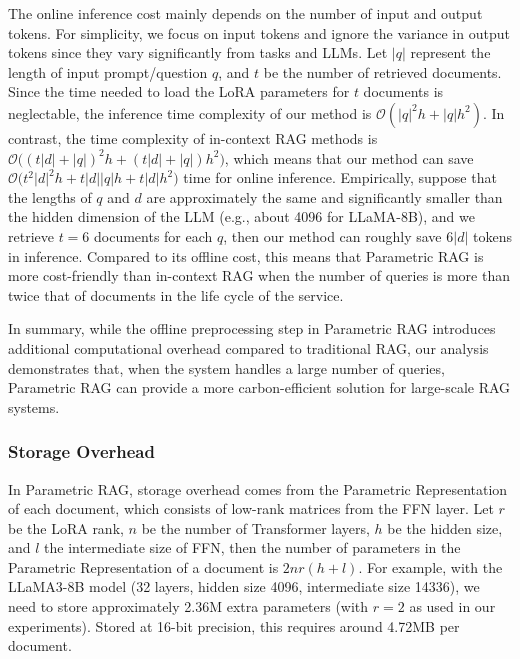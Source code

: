 \documentclass[sigconf,natbib=true,anonymous=false]{acmart}
\begin{document}
The online inference cost mainly depends on the number of input and output tokens. 
For simplicity, we focus on input tokens and ignore the variance in output tokens since they vary significantly from tasks and LLMs. 
Let $|q|$ represent the length of input prompt/question $q$, and $t$ be the number of retrieved documents.
Since the time needed to load the LoRA parameters for $t$ documents is neglectable, the inference time complexity of our method is $\mathcal{O}(|q|^2h+|q|h^2)$.
In contrast, the time complexity of in-context RAG methods is $\mathcal{O}\big((t|d|+|q|)^2h+(t|d|+|q|)h^2\big)$, which means that our method can save $\mathcal{O}\big(t^2|d|^2h+t|d||q|h+t|d|h^2\big)$ time for online inference.
Empirically, suppose that the lengths of $q$ and $d$ are approximately the same and significantly smaller than the hidden dimension of the LLM (e.g., about 4096 for LLaMA-8B), and we retrieve $t=6$ documents for each $q$, then our method can roughly save $6|d|$ tokens in inference.  
Compared to its offline cost, this means that Parametric RAG is more cost-friendly than in-context RAG when the number of queries is more than twice that of documents in the life cycle of the service.

In summary, while the offline preprocessing step in Parametric RAG introduces additional computational overhead compared to traditional RAG, our analysis demonstrates that, when the system handles a large number of queries, Parametric RAG can provide a more carbon-efficient solution for large-scale RAG systems.







\subsubsection{Storage Overhead}
In Parametric RAG, storage overhead comes from the Parametric Representation of each document, which consists of low-rank matrices from the FFN layer. Let \( r \) be the LoRA rank, $n$ be the number of Transformer layers, $h$ be the hidden size, and \( l \) the intermediate size of FFN, then the number of parameters in the Parametric Representation of a document is \( 2nr(h+l) \).
For example, with the LLaMA3-8B model (32 layers, hidden size 4096, intermediate size 14336), we need to store approximately 2.36M extra parameters (with \( r = 2 \) as used in our experiments). Stored at 16-bit precision, this requires around 4.72MB per document.
\end{document}
